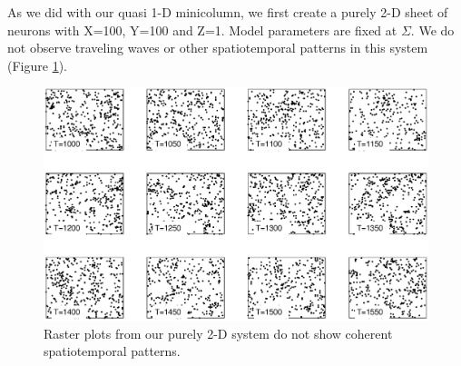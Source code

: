 As we did with our quasi 1-D minicolumn, we first create a purely 2-D sheet of neurons with X=100, Y=100 and Z=1.
Model parameters are fixed at $\Sigma$.
We do not observe traveling waves or other spatiotemporal patterns in this system (Figure \ref{fig:Pure2DRasters_NoWaves}).
\begin{figure}[!htb]
 \caption{ Raster plots from our purely 2-D system do not show coherent spatiotemporal patterns.}
 \label{fig:Pure2DRasters_NoWaves}
 \centering
   \includegraphics[width=\textwidth]{fig/2DWaveRasters_1LayerNoWaves}
\end{figure}
\FloatBarrier


